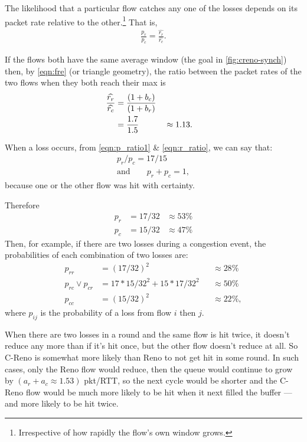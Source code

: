 The likelihood that a particular flow catches any one of the losses depends on its packet rate relative to the other.\footnote{Irrespective of how rapidly the flow's own window grows.} That is,
\begin{align}
	\frac{p_r}{p_c} = \frac{\widehat{r_r}}{\widehat{r_c}}.\label{eqn:p_ratio1}
\end{align}


If the flows both have the same average window (the goal in \autoref{fig:creno-synch})
then, by \autoref{eqn:fre} (or triangle geometry), the ratio between the packet rates of the two flows when they both reach their max is
\begin{align}
\frac{\widehat{r_r}}{\widehat{r_c}} &= \frac{(1 + b_c)}{(1 + b_r)}\notag\\
        &= \frac{1.7}{1.5} &&\approx 1.13.\label{eqn:r_ratio}
\end{align}

When a loss occurs, from \autoref{eqn:p_ratio1} \& \autoref{eqn:r_ratio}, we can say that:
\begin{align}
	p_r / p_c = 17/15\label{eqn:p_ratio}\\
\mathrm{and}\qquad p_r + p_c = 1,
\end{align}
because one or the other flow was hit with certainty.

Therefore
\begin{align*}
p_r &= 17/32 &\approx 53\%\\
p_c &= 15/32 &\approx 47\%
\end{align*}
Then, for example, if there are two losses during a congestion event, the probabilities of each combination of two losses are:
\begin{align*}
p_{rr}              &= (17/32)^2               &&\approx 28\%\\
p_{rc} \lor p_{cr}  &= 17*15/32^2 + 15*17/32^2 &&\approx 50\%\\
p_{cc}              &= (15/32)^2               &&\approx 22\%,
\end{align*}
where \(p_{ij}\) is the probability of a loss from flow \(i\) then \(j\).

When there are two losses in a round and the same flow is hit twice, it doesn't reduce any more than if it's hit once, but the other flow doesn't reduce at all. So C-Reno is somewhat more likely than Reno to not get hit in some round. In such cases, only the Reno flow would reduce, then the queue would continue to grow by \((a_r + a_c \approx 1.53)\) pkt/RTT, so the next cycle would be shorter and the C-Reno flow would be much more likely to be hit when it next filled the buffer --- and more likely to be hit twice.

